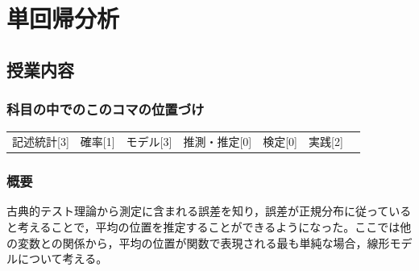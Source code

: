 \section{単回帰分析}
\label{s09_Regression}

\subsection{授業内容}
\subsubsection{科目の中でのこのコマの位置づけ}
\begin{tabular}[t]{ccccccc}
	記述統計[3] & 確率[1] & モデル[3] & 推測・推定[0] & 検定[0] & 実践[2]
\end{tabular}

\subsubsection{概要}
古典的テスト理論から測定に含まれる誤差を知り，誤差が正規分布に従っていると考えることで，平均の位置を推定することができるようになった。ここでは他の変数との関係から，平均の位置が関数で表現される最も単純な場合，線形モデルについて考える。
